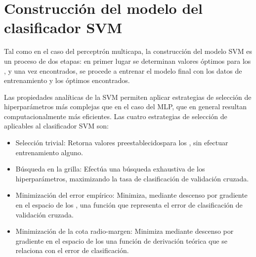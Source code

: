 %
%
\section{Construcción del modelo del clasificador SVM}
%
Tal como en el caso del perceptrón multicapa, la construcción del
modelo SVM es un proceso de dos etapas: en primer lugar se determinan
valores óptimos para los , y una vez encontrados, se procede
a entrenar el modelo final con los datos de entrenamiento y los
 óptimos encontrados.

Las propiedades analíticas de la SVM permiten aplicar estrategias de
selección de hiperparámetros más complejas que en el caso del MLP, que
en general resultan computacionalmente más eficientes.
Las cuatro estrategias de selección de  aplicables al
clasificador SVM son:
%
\begin{itemize}
\item
  Selección trivial: Retorna valores preestablecidospara los
  , sin efectuar entrenamiento alguno.
\item
  Búsqueda en la grilla: Efectúa una búsqueda exhaustiva de los
  hiperparámetros, maximizando la tasa de clasificación de validación
  cruzada.
\item
  Minimización del error empírico: Minimiza, mediante descenso por
  gradiente en el espacio de los , una función que representa
  el error de clasificación de validación cruzada.
\item
  Minimización de la cota radio-margen: Minimiza mediante descenso por
  gradiente en el espacio de los  una función de derivación
  teórica que se relaciona con el error de clasificación.
\end{itemize}
%
